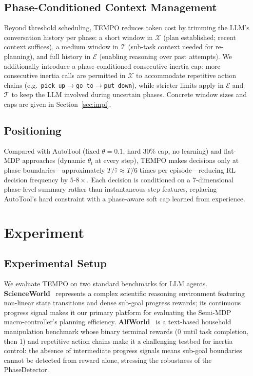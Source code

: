 \documentclass[runningheads]{llncs}
\begin{document}
\subsection{Phase-Conditioned Context Management}
\label{sec:context}

Beyond threshold scheduling, TEMPO reduces token cost by trimming the LLM's conversation history per phase: a short window in $\mathcal{X}$ (plan established; recent context suffices), a medium window in $\mathcal{T}$ (sub-task context needed for re-planning), and full history in $\mathcal{E}$ (enabling reasoning over past attempts).
We additionally introduce a phase-conditioned consecutive inertia cap: more consecutive inertia calls are permitted in $\mathcal{X}$ to accommodate repetitive action chains (e.g.\ \texttt{pick\_up}$\to$\texttt{go\_to}$\to$\texttt{put\_down}), while stricter limits apply in $\mathcal{E}$ and $\mathcal{T}$ to keep the LLM involved during uncertain phases. Concrete window sizes and caps are given in Section~\ref{sec:impl}.

\subsection{Positioning}
\label{sec:comparison}
Compared with AutoTool (fixed $\theta=0.1$, hard 30\% cap, no learning) and flat-MDP approaches (dynamic $\theta_t$ at every step), TEMPO makes decisions only at phase boundaries—approximately $T/\bar{\tau}\approx T/6$ times per episode—reducing RL decision frequency by $5\text{-}8\times$. Each decision is conditioned on a 7-dimensional phase-level summary rather than instantaneous step features, replacing AutoTool's hard constraint with a phase-aware soft cap learned from experience.



\section{Experiment}
\label{sec:exp}

\subsection{Experimental Setup}
We evaluate TEMPO on two standard benchmarks for LLM agents. \textbf{ScienceWorld}~\cite{scienceworld} represents a complex scientific reasoning environment featuring non-linear state transitions and dense sub-goal progress rewards; its continuous progress signal makes it our primary platform for evaluating the Semi-MDP macro-controller's planning efficiency. \textbf{AlfWorld}~\cite{alfworld} is a text-based household manipulation benchmark whose binary terminal rewards (0 until task completion, then 1) and repetitive action chains make it a challenging testbed for inertia control: the absence of intermediate progress signals means sub-goal boundaries cannot be detected from reward alone, stressing the robustness of the PhaseDetector.
\end{document}
